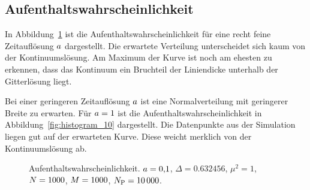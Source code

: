 \subsection{Aufenthaltswahrscheinlichkeit}


In Abbildung~\ref{fig:histogram_01} ist die Aufenthaltswahrscheinlichkeit für
eine recht feine Zeitauflösung $a$ dargestellt. Die erwartete
Verteilung unterscheidet sich kaum von der Kontinuumslösung. Am Maximum der
Kurve ist noch am ehesten zu erkennen, dass das Kontinuum ein Bruchteil der
Liniendicke unterhalb der Gitterlösung liegt.

Bei einer geringeren Zeitauflösung $a$ ist eine Normalverteilung mit
geringerer Breite zu erwarten. Für $a = \num{1}$ ist die
Aufenthaltswahrscheinlichkeit in Abbildung~\ref{fig:histogram_10} dargestellt.
Die Datenpunkte aus der Simulation liegen gut auf der erwarteten Kurve. Diese
weicht merklich von der Kontinuumslösung ab.

\begin{figure}[htbp]
    \centering
    \caption{%
        Aufenthaltswahrscheinlichkeit. $a =
        \num{0.1}$, $\Delta = \num{0.632456}$, $\mu^2 = \num{1}$, $N =
        \num{1000}$, $M = \num{1000}$, $N_\text P = \num{10000}$.
    }
    \label{fig:histogram_01}
\end{figure}

